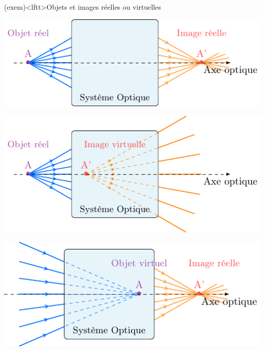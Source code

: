 \documentclass[../../main/main.tex]{subfiles}
\begin{document}
\begin{tcb}[label=exem:rellvirt](exem)<lftt>{Objets et images réelles ou virtuelles}
	\begin{minipage}{0.45\linewidth}
		\begin{center}
			\includegraphics[width=\linewidth]{obj_r-img_r}
			\label{fig:objrimgr}
		\end{center}
	\end{minipage}
	\hfill
	\begin{minipage}{0.45\linewidth}
		\begin{center}
			\includegraphics[width=\linewidth]{obj_r-img_v}
			\label{fig:objrimgv}
		\end{center}
	\end{minipage}
	\begin{minipage}{0.45\linewidth}
		\begin{center}
			\includegraphics[width=\linewidth]{obj_v-img_r}

\end{center}
\end{minipage}
\end{tcb}
\end{document}
